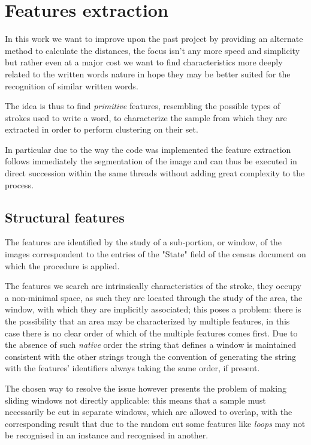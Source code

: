 \section{Features extraction}

In this work we want to improve upon the past project by providing an alternate method to calculate the distances, the focus isn't any more speed and simplicity but rather even at a major cost we want to find characteristics more deeply related to the written words nature in hope they may be better suited for the recognition of similar written words.


The idea is thus to find \emph{primitive} features, resembling the possible types of strokes used to write a word, to characterize the sample from which they are extracted in order to perform clustering on their set.

In particular due to the way the code was implemented the feature extraction follows immediately the segmentation of the image and can thus be executed in direct succession within the same threads without adding great complexity to the process.

\subsection{Structural features}

The features are identified by the study of a sub-portion, or window, of the images correspondent to the entries of the "State" field of the census document on which the procedure is applied.

The features we search are intrinsically characteristics of the stroke, they occupy a non-minimal space, as such they are located through the study of the area, the window, with which they are implicitly associated; this poses a problem: there is the possibility that an area may be characterized by multiple features, in this case there is no clear order of which of the multiple features comes first.
Due to the absence of such \emph{native} order the string that defines a window is maintained consistent with the other strings trough the convention of generating the string with the features' identifiers always taking the same order, if present.

The chosen way to resolve the issue however presents the problem of making sliding windows not directly applicable: this means that a sample must necessarily be cut in separate windows, which are allowed to overlap, with the corresponding result that due to the random cut some features like \textit{loops} may not be recognised in an instance and recognised in another. 

